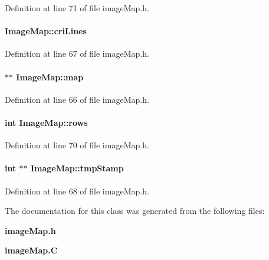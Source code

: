 Definition at line 71 of file image\-Map.h.\label{ImageMap_o1}
\paragraph{ Image\-Map::cri\-Lines\hspace{0.3cm}{\tt  [private]}}\hfill



Definition at line 67 of file image\-Map.h.\label{ImageMap_o0}
\paragraph{ $\ast$$\ast$ Image\-Map::map\hspace{0.3cm}{\tt  [private]}}\hfill



Definition at line 66 of file image\-Map.h.\label{ImageMap_o3}
\paragraph{\setlength{\rightskip}{0pt plus 5cm}int Image\-Map::rows\hspace{0.3cm}{\tt  [private]}}\hfill



Definition at line 70 of file image\-Map.h.\label{ImageMap_o2}
\paragraph{\setlength{\rightskip}{0pt plus 5cm}int $\ast$$\ast$ Image\-Map::tmp\-Stamp\hspace{0.3cm}{\tt  [private]}}\hfill



Definition at line 68 of file image\-Map.h.

The documentation for this class was generated from the following files:\begin{CompactItemize}
\item 
{\bf image\-Map.h}\item 
{\bf image\-Map.C}\end{CompactItemize}
